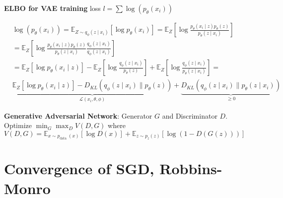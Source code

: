 \textbf{ELBO for VAE training} loss $l=\sum \log \left(p_{\theta}\left(x_{i}\right)\right)$
\begin{tiny}
    \begin{equation*}
        \begin{aligned}
             & \log \left(p_{\theta}\left(x_{i}\right)\right)=\mathbb{E}_{Z \sim q_{\phi}\left(z \mid x_{i}\right)}\left[\log p_{\theta}\left(x_{i}\right)\right] = \mathbb{E}_{Z}\left[\log \frac{p_{\theta}\left(x_{i} \mid z\right) p_{\theta}(z)}{p_{\theta}\left(z \mid x_{i}\right)}\right]                                                                                                                                                                                                                                                                                                                      \\
             & = \mathbb{E}_{Z}\left[\log \frac{p_{\theta}\left(x_{i} \mid z\right) p_{\theta}(z)}{p_{\theta}\left(z \mid x_{i}\right)} \frac{q_{\phi}\left(z \mid x_{i}\right)}{q_{\phi}\left(z \mid x_{i}\right)}\right]                                                                                                                                                                                                                                                                                                                                                                                             \\
             & = \mathbb{E}_{Z}\left[\log p_{\theta}\left(x_{i} \mid z\right)\right] -\mathbb{E}_{Z}\left[\log \frac{q_{\phi}\left(z \mid x_{i}\right)}{p_{\theta}(z)}\right]+\mathbb{E}_{Z}\left[\log \frac{q_{\phi}\left(z \mid x_{i}\right)}{p_{\theta}\left(z \mid x_{i}\right)}\right] = \\
             & \underbrace{\mathbb{E}_{Z}\left[\log p_{\theta}\left(x_{i} \mid z\right)\right]-D_{K L}\left(q_{\phi}\left(z \mid x_{i}\right) \| p_{\theta}(z)\right)}_{\mathcal{L}\left(x_{i}, \theta, \phi\right)}+\underbrace{D_{K L}\left(q_{\phi}\left(z \mid x_{i}\right) \| p_{\theta}\left(z \mid x_{i}\right)\right)}_{\geq 0}
        \end{aligned}
    \end{equation*}
\end{tiny}

\textbf{Generative Adversarial Network}: Generator $G$ and Discriminator $D$. Optimize $\min _{G} \max _{D} V(D, G)$ where $V(D, G) = \mathbb{E}_{x \sim p_{\text {data }}(x)}[\log D(x)]+\mathbb{E}_{z \sim p_{z}(z)}[\log (1-D(G(z)))]$



\section{Convergence of SGD, Robbins-Monro}
